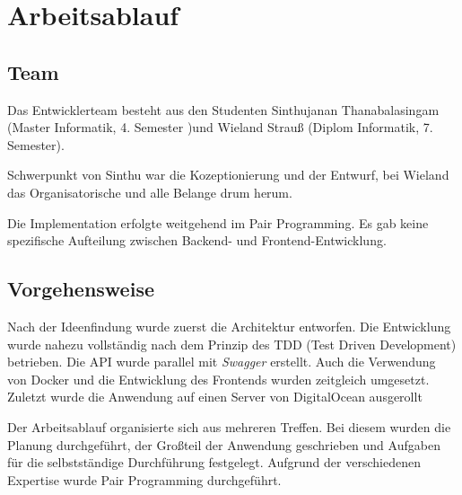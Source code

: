 

\section{Arbeitsablauf}

\subsection{Team}

Das Entwicklerteam besteht aus den Studenten Sinthujanan Thanabalasingam  (Master Informatik, 4. Semester )und Wieland Strauß (Diplom Informatik, 7. Semester). 

Schwerpunkt von Sinthu war die Kozeptionierung und der Entwurf, bei Wieland das Organisatorische und alle Belange drum herum.

Die Implementation erfolgte weitgehend im Pair Programming. Es gab keine spezifische Aufteilung zwischen Backend- und Frontend-Entwicklung.  

\subsection{Vorgehensweise}

Nach der Ideenfindung wurde zuerst die Architektur entworfen. 
Die Entwicklung wurde nahezu vollständig nach dem Prinzip des TDD (Test Driven Development) betrieben. 
Die API wurde parallel mit \textit{Swagger} erstellt. 
Auch die Verwendung von Docker und die Entwicklung des Frontends wurden zeitgleich umgesetzt.
Zuletzt wurde die Anwendung auf einen Server von DigitalOcean ausgerollt

Der Arbeitsablauf organisierte sich aus mehreren Treffen. Bei diesem wurden die Planung durchgeführt, der Großteil der Anwendung geschrieben und Aufgaben für die selbstständige Durchführung festgelegt. Aufgrund der verschiedenen Expertise wurde  Pair Programming durchgeführt. 


